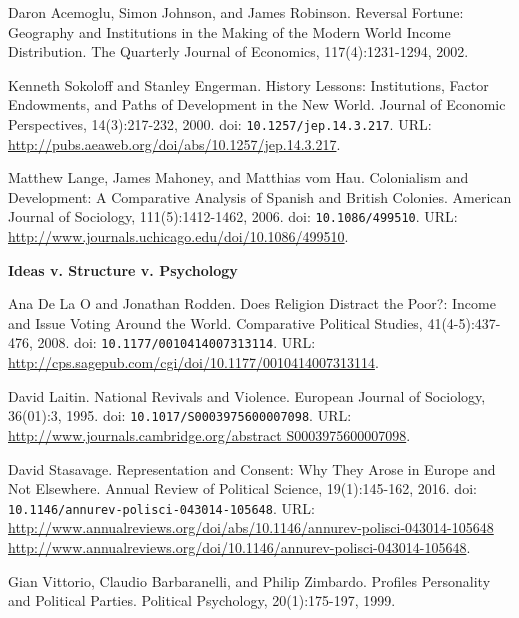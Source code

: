 \documentclass[letterpaper]{article}
\renewenvironment{itemize}{
  \begin{list}{}{
    \setlength{\leftmargin}{1.5em}
  }
}{
  \end{list}
}
\begin{document}
\begin{enumerate}
\begin{itemize}
		\item[$\bullet$] Daron Acemoglu, Simon Johnson, and James Robinson. Reversal Fortune: Geography and Institutions in the Making of the Modern World Income Distribution. The Quarterly Journal of Economics, 117(4):1231-1294, 2002.
		\item[$\bullet$] Kenneth Sokoloff and Stanley Engerman. History Lessons: Institutions, Factor Endowments, and Paths of Development in the New World. Journal of Economic Perspectives, 14(3):217-232, 2000. doi: \texttt{10.1257/jep.14.3.217}. URL: \url{http://pubs.aeaweb.org/doi/abs/10.1257/jep.14.3.217}.
		\item[$\bullet$] Matthew Lange, James Mahoney, and Matthias vom Hau. Colonialism and Development: A Comparative Analysis of Spanish and British Colonies. American Journal of Sociology, 111(5):1412-1462, 2006. doi: \texttt{10.1086/499510}. URL: \url{http://www.journals.uchicago.edu/doi/10.1086/499510}.
	\end{itemize}
  


\item {\bf Ideas v. Structure v. Psychology}
	\begin{itemize}
		\item[$\bullet$] Ana De La O and Jonathan Rodden. Does Religion Distract the Poor?: Income and Issue Voting Around the World. Comparative Political Studies, 41(4-5):437-476, 2008. doi: \texttt{10.1177/0010414007313114}. URL: \url{http://cps.sagepub.com/cgi/doi/10.1177/0010414007313114}.
		\item[$\bullet$] David Laitin. National Revivals and Violence. European Journal of Sociology, 36(01):3, 1995. doi: \texttt{10.1017/S0003975600007098}. URL: \url{http://www.journals.cambridge.org/abstract S0003975600007098}.
		\item[$\bullet$] David Stasavage. Representation and Consent: Why They Arose in Europe and Not Elsewhere. Annual Review of Political Science, 19(1):145-162, 2016. doi: \texttt{10.1146/annurev-polisci-043014-105648}. URL: \url{http://www.annualreviews.org/doi/abs/10.1146/annurev-polisci-043014-105648 http://www.annualreviews.org/doi/10.1146/annurev-polisci-043014-105648}.
		\item[$\bullet$] Gian Vittorio, Claudio Barbaranelli, and Philip Zimbardo. Profiles Personality and Political Parties. Political Psychology, 20(1):175-197, 1999.

	\end{itemize}


\end{enumerate}


 









%
%
\end{document}
